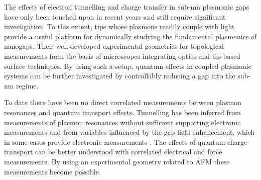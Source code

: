 \documentclass[12pt, a4paper, oneside]{book}
\begin{document}
The effects of electron tunnelling and charge transfer in sub-nm plasmonic gaps have only been touched upon in recent years and still require significant investigation. To this extent, tips whose plasmons readily couple with light provide a useful platform for dynamically studying the fundamental plasmonics of nanogaps. Their well-developed experimental geometries for topological measurements form the basis of microscopes integrating optics and tip-based surface techniques. By using such a setup, quantum effects in coupled plasmonic systems can be further investigated by controllably reducing a gap into the sub-nm regime.

To date there have been no direct correlated measurements between plasmon resonances and quantum transport effects. Tunnelling has been inferred from measurements of plasmon resonances without sufficient supporting electronic measurements \cite{savage2012, scholl2013} and from variables influenced by the gap field enhancement, which in some cases provide electronic measurements \cite{tan2014, zhu2014, hajisalem2014, cha2014}. The effects of quantum charge transport can be better understood with correlated electrical and force measurements. By using an experimental geometry related to AFM these measurements become possible.

\ifstandalone
\begin{singlespace}
\fontsize{8pt}{1em}\selectfont
\printbibliography[notcategory=fullcited]
\end{singlespace}
\fi
\end{document}

